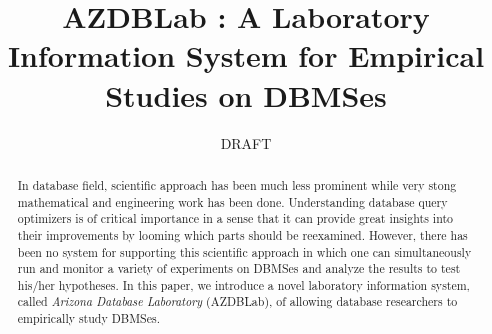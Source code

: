 \documentclass[conference]{IEEEtran}
\begin{document}
\date{}

\title{{\sc AZDBLab} : A Laboratory Information System for Empirical Studies on DBMSes}
%
\author{
DRAFT
}

\maketitle

\begin{abstract} 
In database field, scientific approach has been much less prominent while very stong 
mathematical and engineering work has been done. 
Understanding database query optimizers is of critical importance in a sense that it can provide 
great insights into their improvements by looming which parts should be reexamined. 
However, there has been no system for supporting this scientific approach in which one can 
simultaneously run and monitor a variety of experiments on DBMSes and analyze the 
results to test his/her hypotheses. 
In this paper, we introduce a novel laboratory information system, 
called {\em Arizona Database Laboratory} ({\sc AZDBLab}), of allowing database researchers 
to empirically study DBMSes. 
%
\end{abstract}
\end{document}
